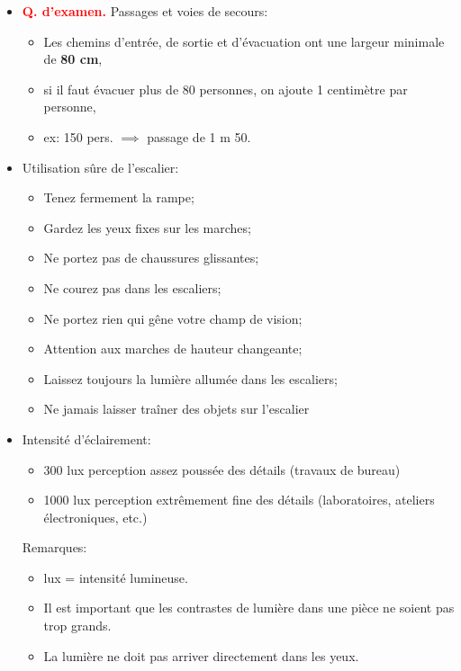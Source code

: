 \documentclass[a4paper]{article}
\begin{document}
\begin{itemize}
\item \textcolor{red}{\textbf{Q. d'examen.}} Passages et voies de secours:
\begin{itemize}
    \item Les chemins d’entrée, de sortie et d’évacuation ont une largeur minimale de \textbf{80 cm},
    \item si il faut évacuer plus de 80 personnes, on ajoute 1 centimètre par personne,
    \item ex: 150 pers. $ \implies $ passage de 1 m 50.
\end{itemize}





\item Utilisation sûre de l’escalier:
\begin{itemize}
    \item Tenez fermement la rampe;
    \item Gardez les yeux fixes sur les marches;
    \item Ne portez pas de chaussures glissantes;
    \item Ne courez pas dans les escaliers;
    \item Ne portez rien qui gêne votre champ de vision;
    \item Attention aux marches de hauteur changeante;
    \item Laissez toujours la lumière allumée dans les escaliers;
    \item Ne jamais laisser traîner des objets sur l’escalier
\end{itemize}





\item Intensité d'éclairement:
\begin{itemize}
    \item 300 lux perception assez poussée des détails (travaux de bureau)
    \item 1000 lux perception extrêmement fine des détails (laboratoires, ateliers électroniques, etc.)
\end{itemize}
Remarques:
\begin{itemize}
    \item lux = intensité lumineuse.
    \item Il est important que les contrastes de lumière dans une pièce ne soient pas trop grands.
    \item La lumière ne doit pas arriver directement dans les yeux.
\end{itemize}






\end{itemize}
\end{document}
